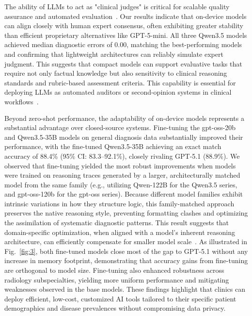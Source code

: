 \documentclass[10pt,journal,compsoc, onecolumn]{IEEEtran}
\begin{document}
The ability of LLMs to act as "clinical judges" is critical for scalable quality assurance and automated evaluation~\cite{kocaman2025clever, croxford2025evaluating}. Our results indicate that on-device models can align closely with human expert consensus, often exhibiting greater stability than efficient proprietary alternatives like GPT-5-mini. All three Qwen3.5 models achieved median diagnostic errors of 0.00, matching the best-performing models and confirming that lightweight architectures can reliably simulate expert judgment. This suggests that compact models can support evaluative tasks that require not only factual knowledge but also sensitivity to clinical reasoning standards and rubric-based assessment criteria. This capability is essential for deploying LLMs as automated auditors or second-opinion systems in clinical workflows~\cite{humaneval2025llmjudge, genovese2026artificial}.

Beyond zero-shot performance, the adaptability of on-device models represents a substantial advantage over closed-source systems. Fine-tuning the gpt-oss-20b and Qwen3.5-35B models on general diagnosis data substantially improved their performance, with the fine-tuned Qwen3.5-35B achieving an exact match accuracy of 88.4\% (95\% CI: 83.3--92.1\%), closely rivaling GPT-5.1 (88.9\%). We observed that fine-tuning yielded the most robust improvements when models were trained on reasoning traces generated by a larger, architecturally matched model from the same family (e.g., utilizing Qwen-122B for the Qwen3.5 series, and gpt-oss-120b for the gpt-oss series). Because different model families exhibit intrinsic variations in how they structure logic, this family-matched approach preserves the native reasoning style, preventing formatting clashes and optimizing the assimilation of systematic diagnostic patterns. This result suggests that domain-specific optimization, when aligned with a model's inherent reasoning architecture, can efficiently compensate for smaller model scale~\cite{davis2026medslice, guluzade2025elmtex, wind2025rar}. As illustrated in Fig.~\ref{fig:3}, both fine-tuned models close most of the gap to GPT-5.1 without any increase in memory footprint, demonstrating that accuracy gains from fine-tuning are orthogonal to model size. Fine-tuning also enhanced robustness across radiology subspecialties, yielding more uniform performance and mitigating weaknesses observed in the base models. These findings highlight that clinics can deploy efficient, low-cost, customized AI tools tailored to their specific patient demographics and disease prevalences without compromising data privacy.
\end{document}
